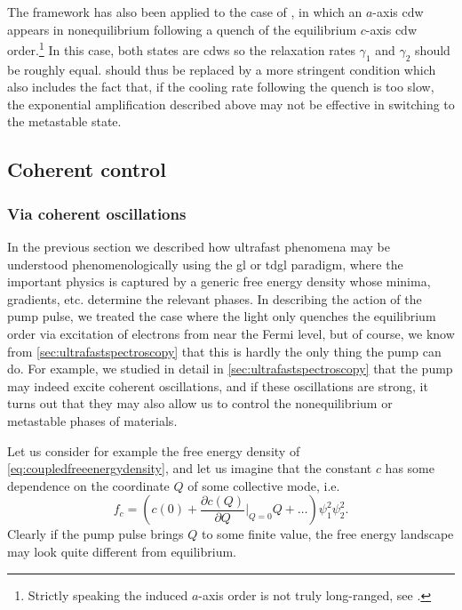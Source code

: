 The framework has also been applied to the case of , in which an $a$-axis \gls{cdw} appears in nonequilibrium following a quench of the equilibrium $c$-axis \gls{cdw} order.\footnote{Strictly speaking the induced $a$-axis order is not truly long-ranged, see \citet{zong_role_2021}.}
In this case, both states are \glspl{cdw} so the relaxation rates $\gamma_1$ and $\gamma_2$ should be roughly equal.
 should thus be replaced by a more stringent condition which also includes the fact that, if the cooling rate following the quench is too slow, the exponential amplification described above may not be effective in switching to the metastable state\citep{sun_transient_2020}.

\subsection{Coherent control}

\subsubsection{Via coherent oscillations}

In the previous section we described how ultrafast phenomena may be understood phenomenologically using the \gls{gl} or \gls{tdgl} paradigm, where the important physics is captured by a generic free energy density whose minima, gradients, etc. determine the relevant phases.
In describing the action of the pump pulse, we treated the case where the light only quenches the equilibrium order via excitation of electrons from near the Fermi level, but of course, we know from \cref{sec:ultrafastspectroscopy} that this is hardly the only thing the pump can do.
For example, we studied in detail in \cref{sec:ultrafastspectroscopy} that the pump may indeed excite coherent oscillations, and if these oscillations are strong, it turns out that they may also allow us to control the nonequilibrium or metastable phases of materials.

Let us consider for example the free energy density of \cref{eq:coupledfreeenergydensity}, and let us imagine that the constant $c$ has some dependence on the coordinate $Q$ of some collective mode, i.e.
\begin{equation}\label{eq:latticefreeenergydensity}
f_c = \left(c(0)+\frac{\partial c(Q)}{\partial Q}\Big|_{Q=0}Q+\ldots\right)\psi_1^2\psi_2^2.
\end{equation}
Clearly if the pump pulse brings $Q$ to some finite value, the free energy landscape may look quite different from equilibrium.

